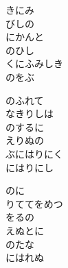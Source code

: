 \documentclass[10pt,b5j]{tarticle} %
\begin{document}
\begin{enumerate}
\begin{minipage}[c]{\blocksize}
        \vspace{\linespace}
        \item
        きにみ\\
        びしの\\
        にかんと\\
        のひし\\
        くにふみしき\\
        のをぶ
        
        \vspace{\linespace}
        \item
        のふれて\\
        なきりしは\\
        のするに\\
        えりぬの\\
        ぶにはりにく\\
        にはりにし
        
        \vspace{\linespace}
        \item
        のに\\
        りててをめつ\\
        をるの\\
        えぬとに\\
        のたな\\
        にはれぬ
    
    \end{minipage}
\end{enumerate} %
\end{document}
